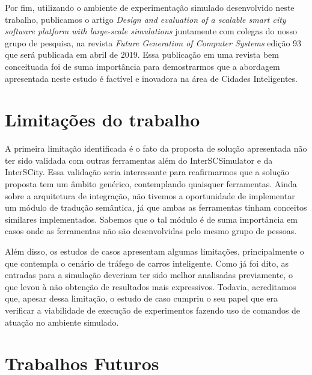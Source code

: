 Por fim, utilizando o ambiente de experimentação simulado desenvolvido neste trabalho, publicamos o artigo \textit{Design and evaluation of a scalable smart city software platform with
large-scale simulations}\citep{esposte_2019} juntamente com colegas do nosso grupo de pesquisa, na revista \textit{Future Generation of
Computer Systems} edição 93 que será publicada em abril de 2019.  
Essa publicação em uma revista bem conceituada foi de suma importância para demostrarmos que a abordagem apresentada neste estudo é factível e inovadora na área de Cidades Inteligentes.


\section{Limitações do trabalho}


A primeira limitação identificada é o fato da proposta de solução apresentada não ter sido validada com outras ferramentas além do InterSCSimulator e da InterSCity.
Essa validação seria interessante para reafirmarmos que a solução proposta tem um âmbito genérico, contemplando quaisquer ferramentas.
Ainda sobre a arquitetura de integração, não tivemos a oportunidade de implementar um módulo de tradução semântica, já que ambas as ferramentas tinham conceitos similares implementados.
Sabemos que o tal módulo é de suma importância em casos onde as ferramentas não são desenvolvidas pelo mesmo grupo de pessoas.

Além disso, os estudos de casos apresentam algumas limitações, principalmente o que contempla o cenário de tráfego de carros inteligente.
Como já foi dito, as entradas para a simulação deveriam ter sido melhor analisadas previamente, o que levou à não obtenção de resultados mais expressivos.
Todavia, acreditamos que, apesar dessa limitação, o estudo de caso cumpriu o seu papel que era verificar a viabilidade de execução de experimentos fazendo uso de comandos de atuação no
ambiente simulado.

\section{Trabalhos Futuros}

%
%


